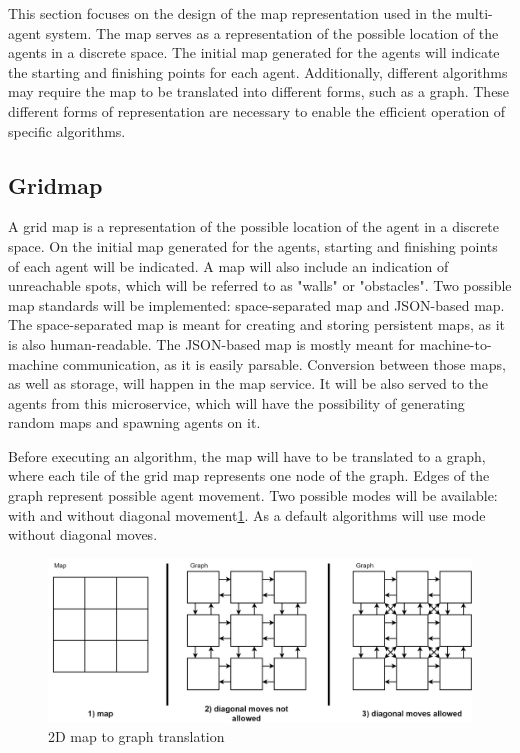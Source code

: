 This section focuses on the design of the map representation used in the multi-agent system. The map serves as a representation of the possible location of the agents in a discrete space. The initial map generated for the agents will indicate the starting and finishing points for each agent. Additionally, different algorithms may require the map to be translated into different forms, such as a graph. These different forms of representation are necessary to enable the efficient operation of specific algorithms. 

\subsection{Gridmap}
A grid map is a representation of the possible location of the agent in a discrete space. On the initial map generated for the agents, starting and finishing points of each agent will be indicated. A map will also include an indication of unreachable spots, which will be referred to as "walls" or "obstacles". Two possible map standards will be implemented: space-separated map and JSON-based map. The space-separated map is meant for creating and storing persistent maps, as it is also human-readable. The JSON-based map is mostly meant for machine-to-machine communication, as it is easily parsable. Conversion between those maps, as well as storage, will happen in the map service. It will be also served to the agents from this microservice, which will have the possibility of generating random maps and spawning agents on it.

Before executing an algorithm, the map will have to be translated to a graph, where each tile of the grid map represents one node of the graph. Edges of the graph represent possible agent movement. Two possible modes will be available: with and without diagonal movement\ref{fig:map_2D}. As a default algorithms will use mode without diagonal moves.

\begin{figure}[H]
    \centering
    \includegraphics[width=\textwidth]{pictures/map_2d.png}
    \caption{ 2D map to graph translation }
    \label{fig:map_2D}
\end{figure}


